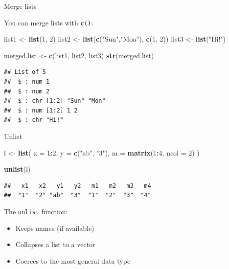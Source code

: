 \documentclass[ignorenonframetext,]{beamer}
\newenvironment{Shaded}{\begin{snugshade}}{\end{snugshade}}
\newcommand{\DataTypeTok}[1]{\textcolor[rgb]{0.13,0.29,0.53}{#1}}
\newcommand{\DecValTok}[1]{\textcolor[rgb]{0.00,0.00,0.81}{#1}}
\newcommand{\KeywordTok}[1]{\textcolor[rgb]{0.13,0.29,0.53}{\textbf{#1}}}
\newcommand{\NormalTok}[1]{#1}
\newcommand{\OperatorTok}[1]{\textcolor[rgb]{0.81,0.36,0.00}{\textbf{#1}}}
\newcommand{\StringTok}[1]{\textcolor[rgb]{0.31,0.60,0.02}{#1}}
\providecommand{\tightlist}{%
  \setlength{\itemsep}{0pt}\setlength{\parskip}{0pt}}
\begin{document}
\begin{frame}[fragile]{Merge lists}
\protect\hypertarget{merge-lists}{}

You can merge lists with \texttt{c()}:

\begin{Shaded}
\begin{Highlighting}[]
\NormalTok{list1 <-}\StringTok{ }\KeywordTok{list}\NormalTok{(}\DecValTok{1}\NormalTok{, }\DecValTok{2}\NormalTok{)}
\NormalTok{list2 <-}\StringTok{ }\KeywordTok{list}\NormalTok{(}\KeywordTok{c}\NormalTok{(}\StringTok{"Sun"}\NormalTok{,}\StringTok{"Mon"}\NormalTok{), }\KeywordTok{c}\NormalTok{(}\DecValTok{1}\NormalTok{, }\DecValTok{2}\NormalTok{))}
\NormalTok{list3 <-}\StringTok{ }\KeywordTok{list}\NormalTok{(}\StringTok{"Hi!"}\NormalTok{)}

\NormalTok{merged.list <-}\StringTok{ }\KeywordTok{c}\NormalTok{(list1, list2, list3)}
\KeywordTok{str}\NormalTok{(merged.list)}
\end{Highlighting}
\end{Shaded}

\begin{verbatim}
## List of 5
##  $ : num 1
##  $ : num 2
##  $ : chr [1:2] "Sun" "Mon"
##  $ : num [1:2] 1 2
##  $ : chr "Hi!"
\end{verbatim}

\end{frame}

\begin{frame}[fragile]{Unlist}
\protect\hypertarget{unlist}{}

\begin{Shaded}
\begin{Highlighting}[]
\NormalTok{l <-}\StringTok{ }\KeywordTok{list}\NormalTok{(}
  \DataTypeTok{x =} \DecValTok{1}\OperatorTok{:}\DecValTok{2}\NormalTok{,}
  \DataTypeTok{y =} \KeywordTok{c}\NormalTok{(}\StringTok{"ab"}\NormalTok{, }\StringTok{"3"}\NormalTok{),}
  \DataTypeTok{m =} \KeywordTok{matrix}\NormalTok{(}\DecValTok{1}\OperatorTok{:}\DecValTok{4}\NormalTok{, }\DataTypeTok{ncol =} \DecValTok{2}\NormalTok{)}
\NormalTok{)}

\KeywordTok{unlist}\NormalTok{(l)}
\end{Highlighting}
\end{Shaded}

\begin{verbatim}
##   x1   x2   y1   y2   m1   m2   m3   m4 
##  "1"  "2" "ab"  "3"  "1"  "2"  "3"  "4"
\end{verbatim}

The \texttt{unlist} function:

\begin{itemize}
\tightlist
\item
  Keeps names (if available)
\item
  Collapses a list to a vector
\item
  Coerces to the most general data type
\end{itemize}

\end{frame}
\end{document}
